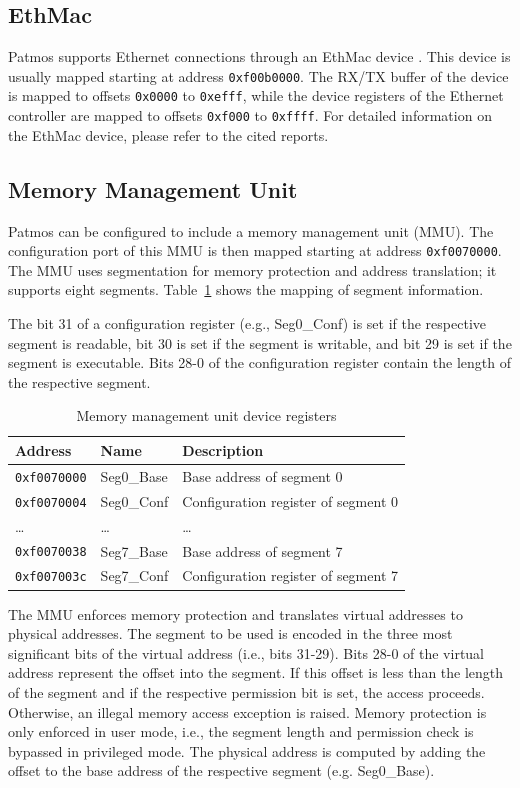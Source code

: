 \documentclass[a4paper,fontsize=10pt,twoside,DIV15,BCOR12mm,headinclude=true,footinclude=false,pagesize,bibtotoc]{scrbook}
\newcommand{\code}[1]{{\texttt{#1}}}
\begin{document}
\subsection{EthMac}

Patmos supports Ethernet connections through an EthMac device
\cite{mohor2002ethernet,pezzarossa2015ethernet}. This device is
usually mapped starting at address \code{0xf00b0000}. The RX/TX buffer
of the device is mapped to offsets \code{0x0000} to \code{0xefff},
while the device registers of the Ethernet controller are mapped to
offsets \code{0xf000} to \code{0xffff}. For detailed information on
the EthMac device, please refer to the cited reports.

\subsection{Memory Management Unit}

Patmos can be configured to include a memory management unit
(MMU). The configuration port of this MMU is then mapped starting at
address \code{0xf0070000}. The MMU uses segmentation for memory
protection and address translation; it supports eight
segments. Table~\ref{tab:mmu} shows the mapping of segment
information.

The bit 31 of a configuration register (e.g., Seg0\_Conf) is
set if the respective segment is readable, bit 30 is set if the
segment is writable, and bit 29 is set if the segment is
executable. Bits 28-0 of the configuration register contain the length
of the respective segment.

\begin{table}
\centering
\begin{tabular}{lll}
\toprule
Address & Name & Description \\
\midrule
\code{0xf0070000} & Seg0\_Base & Base address of segment 0 \\
\code{0xf0070004} & Seg0\_Conf & Configuration register of segment 0 \\
\dots & \dots & \dots \\
\code{0xf0070038} & Seg7\_Base & Base address of segment 7 \\
\code{0xf007003c} & Seg7\_Conf & Configuration register of segment 7 \\
\bottomrule
\end{tabular}
\caption{Memory management unit device registers}
\label{tab:mmu}
\end{table}

The MMU enforces memory protection and translates virtual addresses to
physical addresses. The segment to be used is encoded in the three
most significant bits of the virtual address (i.e., bits 31-29). Bits
28-0 of the virtual address represent the offset into the segment. If
this offset is less than the length of the segment and if the
respective permission bit is set, the access proceeds. Otherwise, an
illegal memory access exception is raised. Memory protection is only
enforced in user mode, i.e., the segment length and permission check
is bypassed in privileged mode. The physical address is computed by
adding the offset to the base address of the respective segment
(e.g. Seg0\_Base).
\end{document}
